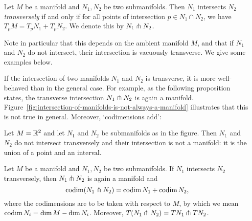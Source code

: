 \begin{definition}[Transversality]
    Let $M$ be a manifold and $N_1, N_2$ be two submanifolds.
    Then $N_1$ intersects $N_2$ \emph{transversely} if and only if for all points of intersection $p \in N_1 \cap N_2$, we have
    $T_pM = T_pN_1 + T_p N_2$.
    We denote this by $ N_1 \pitchfork N_2$.\sidenotemark
\end{definition}
Note in particular that this depends on the ambient manifold $M$, and that if $N_1$ and $N_2$ do not intersect, their intersection is vacuously transverse.
We give some examples below.
\begin{figure}[H]
    \centering
\end{figure}
If the intersection of two manifolds $ N_1$ and $N_2$ is transverse, it is more well-behaved than in the general case.
For example, as the following proposition states, the transverse intersection $N_1 \pitchfork N_2$ is again a manifold.
Figure~\ref{fig:intersection-of-manifolds-is-not-always-a-manifold} illustrates that this is not true in general. Moreover, `codimensions add':
\begin{marginfigure}
    \centering
    \caption{Let $M = \mathbb{R}^2$ and let $N_1$ and $N_2$ be submanifolds as in the figure. Then $N_1$ and $N_2$ do not intersect transversely and their intersection is not a manifold: it is the union of a point and an interval.}
    \label{fig:intersection-of-manifolds-is-not-always-a-manifold}
\end{marginfigure}
\begin{prop}
    Let $M$ be a manifold and $N_1, N_2$ be two submanifolds. If $N_1$ intersects $N_2$ transversely, then $ N_1 \pitchfork N_2$ is again a manifold and 
    \[
        \operatorname{codim} (N_1 \pitchfork N_2) = \operatorname{codim} N_1 + \operatorname{codim} N_2
    ,\] 
    where the codimensions are to be taken with respect to $M$, by which we mean $\operatorname{codim} N_i = \dim M - \dim N_i$.
    Moreover, $T(N_1\pitchfork N_2) = TN_1 \pitchfork TN_2$.
\label{prop:transverse-codimensions-add}
\end{prop}
